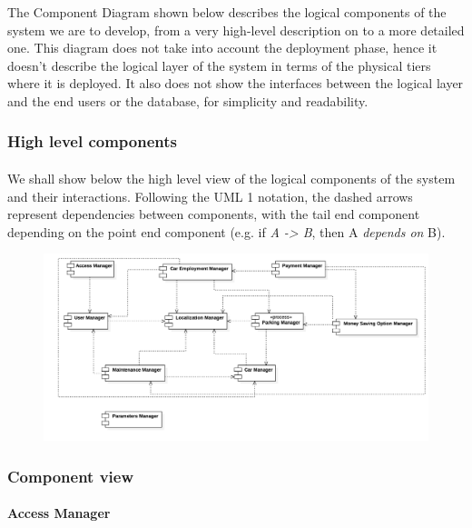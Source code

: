 The Component Diagram shown below describes the logical components of the system we are to develop, from a very high-level description on to a more detailed one. This diagram does not take into account the deployment phase, hence it doesn't describe the logical layer of the system in terms of the physical tiers where it is deployed. It also does not show the interfaces between the logical layer and the end users or the database, for simplicity and readability. %


	\subsubsection{High level components}
		\paragraph{} We shall show below the high level view of the logical components of the system and their interactions. Following the UML 1 notation, the dashed arrows represent dependencies between components, with the tail end component depending on the point end component (e.g. if \textit{A -> B}, then A \textit{depends on} B). 

		
		\begin{figure}[h]
			\includegraphics[scale=0.24]{img/component_diagrams/01_high_level_component_view.png}
		\end{figure}



	\subsubsection{Component view}
	
	
	
		\paragraph{Access Manager}
		
